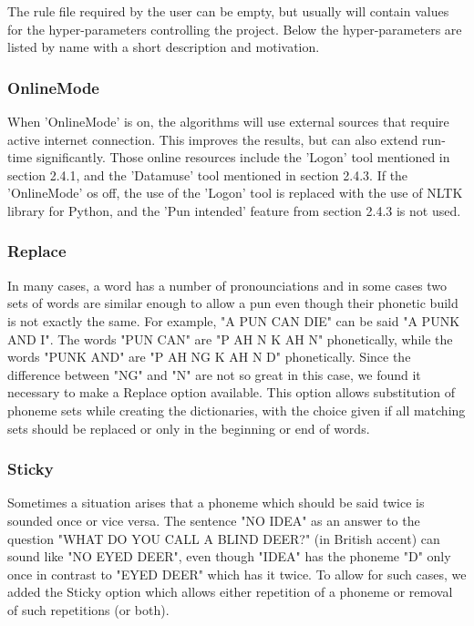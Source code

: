 \documentclass[11pt,a4paper]{article}
\begin{document}
The rule file required by the user can be empty, but usually will contain values for the hyper-parameters controlling the project. Below the hyper-parameters are listed by name with a short description and motivation.

\subsubsection{OnlineMode}
When 'OnlineMode' is on, the algorithms will use external sources that require active internet connection. This improves the results, but can also extend run-time significantly. Those online resources include the 'Logon' tool mentioned in section 2.4.1, and the 'Datamuse' tool mentioned in section 2.4.3. 
If the 'OnlineMode' os off, the use of the 'Logon' tool is replaced with the use of NLTK library for Python, and the 'Pun intended' feature from section 2.4.3 is not used.

\subsubsection{Replace}
In many cases, a word has a number of pronounciations and in some cases two sets of words are similar enough to allow a pun even though their phonetic build is not exactly the same. For example, "A PUN CAN DIE" can be said "A PUNK AND I". The words "PUN CAN" are "P AH N K AH N" phonetically, while the words "PUNK AND" are "P AH NG K AH N D" phonetically. Since the difference between "NG" and "N" are not so great in this case, we found it necessary to make a Replace option available. This option allows substitution of phoneme sets while creating the dictionaries, with the choice given if all matching sets should be replaced or only in the beginning or end of words.

\subsubsection{Sticky}
Sometimes a situation arises that a phoneme which should be said twice is sounded once or vice versa. The sentence "NO IDEA" as an answer to the question "WHAT DO YOU CALL A BLIND DEER?" (in British accent) can sound like "NO EYED DEER", even though "IDEA" has the phoneme "D" only once in contrast to "EYED DEER" which has it twice. To allow for such cases, we added the Sticky option which allows either repetition of a phoneme or removal of such repetitions (or both).
\end{document}
